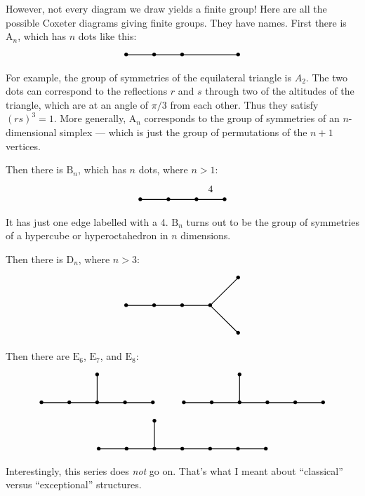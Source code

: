 \documentclass{article}
\begin{document}
However, not every diagram we draw yields a finite group! Here are all
the possible Coxeter diagrams giving finite groups. They have names.
First there is \(\mathrm{A}_n\), which has \(n\) dots like this: \[
  \begin{tikzpicture}
    \draw[thick] (0,0) node{$\bullet$} to (1,0) node{$\bullet$} to (2,0) node {$\bullet$} to (4,0) node{$\bullet$};
  \end{tikzpicture}
\] For example, the group of symmetries of the equilateral triangle is
\(A_2\). The two dots can correspond to the reflections \(r\) and \(s\)
through two of the altitudes of the triangle, which are at an angle of
\(\pi/3\) from each other. Thus they satisfy \((rs)^3 = 1\). More
generally, \(\mathrm{A}_n\) corresponds to the group of symmetries of an
\(n\)-dimensional simplex --- which is just the group of permutations of
the \(n+1\) vertices.

Then there is \(\mathrm{B}_n\), which has \(n\) dots, where \(n > 1\):
\[
  \begin{tikzpicture}
    \draw[thick] (0,0) node{$\bullet$} to (1,0) node{$\bullet$} to (2,0) node{$\bullet$} to node[label=above:{4}]{} (3,0) node {$\bullet$};
  \end{tikzpicture}
\] It has just one edge labelled with a 4. \(\mathrm{B}_n\) turns out to
be the group of symmetries of a hypercube or hyperoctahedron in \(n\)
dimensions.

Then there is \(\mathrm{D}_n\), where \(n > 3\): \[
  \begin{tikzpicture}
    \draw[thick] (0,0) node{$\bullet$} to (1,0) node{$\bullet$} to (2,0) node{$\bullet$} to (3,0) node {$\bullet$};
    \draw[thick] (3,0) to (4,1) node {$\bullet$};
    \draw[thick] (3,0) to (4,-1) node {$\bullet$};
  \end{tikzpicture}
\] Then there are \(\mathrm{E}_6\), \(\mathrm{E}_7\), and
\(\mathrm{E}_8\): \[
  \begin{gathered}
    \begin{tikzpicture}
      \draw[thick] (0,0) node{$\bullet$} to (1,0) node{$\bullet$} to (2,0) node{$\bullet$} to (3,0) node {$\bullet$} to (4,0) node {$\bullet$};
      \draw[thick] (2,0) to (2,1) node{$\bullet$};
    \end{tikzpicture}
    \qquad
    \begin{tikzpicture}
      \draw[thick] (0,0) node{$\bullet$} to (1,0) node{$\bullet$} to (2,0) node{$\bullet$} to (3,0) node {$\bullet$} to (4,0) node {$\bullet$} to (5,0) node {$\bullet$};
      \draw[thick] (2,0) to (2,1) node{$\bullet$};
    \end{tikzpicture}
  \\\begin{tikzpicture}
      \draw[thick] (0,0) node{$\bullet$} to (1,0) node{$\bullet$} to (2,0) node{$\bullet$} to (3,0) node {$\bullet$} to (4,0) node {$\bullet$} to (5,0) node {$\bullet$} to (6,0) node {$\bullet$};
      \draw[thick] (2,0) to (2,1) node{$\bullet$};
    \end{tikzpicture}
  \end{gathered}
\] Interestingly, this series does \emph{not} go on. That's what I meant
about ``classical'' versus ``exceptional'' structures.
\end{document}
